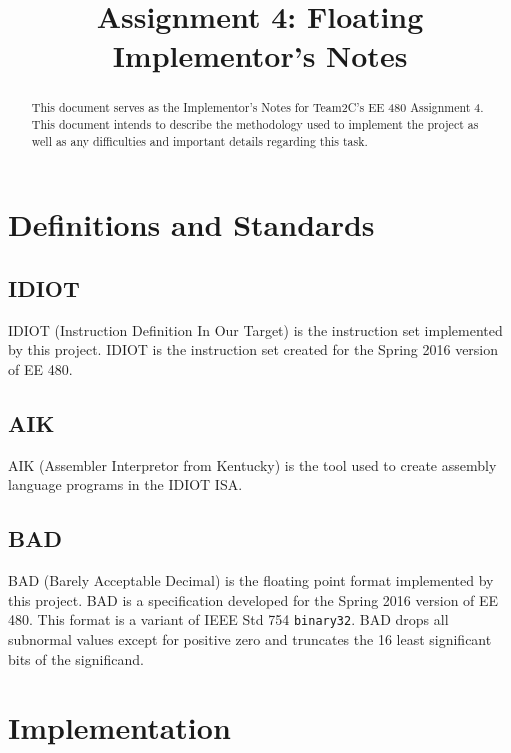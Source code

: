 \documentclass[conference]{IEEEtran}
\begin{document}
\title{Assignment 4: Floating\\Implementor's Notes}
\author{
        \IEEEauthorblockA{}
        }

\maketitle

\begin{abstract}
This document serves as the Implementor's Notes for Team2C's EE 480 Assignment
4. This document intends to describe the methodology used to implement the 
project as well as any difficulties and important details regarding this task.
\end{abstract}

\section{Definitions and Standards}
\subsection{IDIOT}
IDIOT (Instruction Definition In Our Target) is the instruction set implemented
by this project. IDIOT is the instruction set created for the Spring 2016 
version of EE 480.\cite{idiot-isa}
\subsection{AIK}
AIK (Assembler Interpretor from Kentucky) is the tool used to create assembly
language programs in the IDIOT ISA.\cite{aik}
\subsection{BAD}
BAD (Barely Acceptable Decimal) is the floating point format implemented by
this project. BAD is a specification developed for the Spring 2016 version
of EE 480.\cite{idiot-float} This format is a variant of IEEE Std 754 
\texttt{binary32}.\cite{ieee-754} BAD drops all subnormal values except for
positive zero and truncates the 16 least significant bits of the significand.

\section{Implementation}
\end{document}
